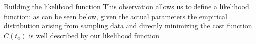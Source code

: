 \documentclass{beamer}
\begin{document}
\begin{frame}{Building the likelihood function}
  This observation allows us to define a likelihood function:
  as can be seen below, given the actual parameters the empirical distribution arising from sampling data and directly minimizing the cost function \(C(t_a)\) is well described by our likelihood function

  \begin{center}
  \end{center}
\end{frame}
\end{document}
